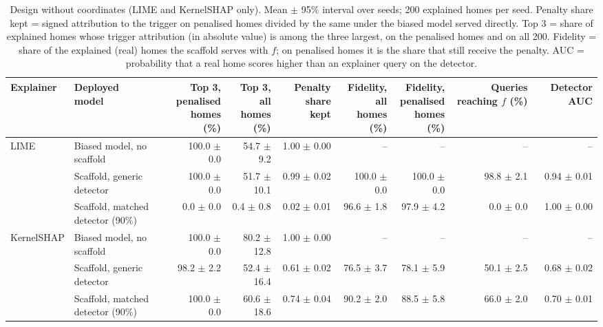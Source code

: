 \begin{table}[t]
\centering
\footnotesize
\setlength{\tabcolsep}{3.5pt}
\begin{adjustbox}{max width=\linewidth}
\begin{tabular}{llrrrrrrr}
\toprule
Explainer & \makecell[b]{Deployed \\ model} & \makecell[b]{Top 3, \\ penalised \\ homes (\%)} & \makecell[b]{Top 3, all \\ homes (\%)} & \makecell[b]{Penalty share \\ kept} & \makecell[b]{Fidelity, all \\ homes (\%)} & \makecell[b]{Fidelity, \\ penalised \\ homes (\%)} & \makecell[b]{Queries \\ reaching $f$ \\ (\%)} & Detector AUC \\
\midrule
LIME & Biased model, no scaffold & 100.0 $\pm$ 0.0 & 54.7 $\pm$ 9.2 & 1.00 $\pm$ 0.00 & -- & -- & -- & -- \\
 & Scaffold, generic detector & 100.0 $\pm$ 0.0 & 51.7 $\pm$ 10.1 & 0.99 $\pm$ 0.02 & 100.0 $\pm$ 0.0 & 100.0 $\pm$ 0.0 & 98.8 $\pm$ 2.1 & 0.94 $\pm$ 0.01 \\
 & Scaffold, matched detector (90\%) & 0.0 $\pm$ 0.0 & 0.4 $\pm$ 0.8 & 0.02 $\pm$ 0.01 & 96.6 $\pm$ 1.8 & 97.9 $\pm$ 4.2 & 0.0 $\pm$ 0.0 & 1.00 $\pm$ 0.00 \\
\midrule
KernelSHAP & Biased model, no scaffold & 100.0 $\pm$ 0.0 & 80.2 $\pm$ 12.8 & 1.00 $\pm$ 0.00 & -- & -- & -- & -- \\
 & Scaffold, generic detector & 98.2 $\pm$ 2.2 & 52.4 $\pm$ 16.4 & 0.61 $\pm$ 0.02 & 76.5 $\pm$ 3.7 & 78.1 $\pm$ 5.9 & 50.1 $\pm$ 2.5 & 0.68 $\pm$ 0.02 \\
 & Scaffold, matched detector (90\%) & 100.0 $\pm$ 0.0 & 60.6 $\pm$ 18.6 & 0.74 $\pm$ 0.04 & 90.2 $\pm$ 2.0 & 88.5 $\pm$ 5.8 & 66.0 $\pm$ 2.0 & 0.70 $\pm$ 0.01 \\
\bottomrule
\end{tabular}
\end{adjustbox}
\caption{Design without coordinates (LIME and KernelSHAP only). Mean $\pm$ 95\% interval over seeds; 200 explained homes per seed. Penalty share kept = signed attribution to the trigger on penalised homes divided by the same under the biased model served directly. Top 3 = share of explained homes whose trigger attribution (in absolute value) is among the three largest, on the penalised homes and on all 200. Fidelity = share of the explained (real) homes the scaffold serves with $f$; on penalised homes it is the share that still receive the penalty. AUC = probability that a real home scores higher than an explainer query on the detector.}
\label{tab:main_nocoord}
\end{table}
